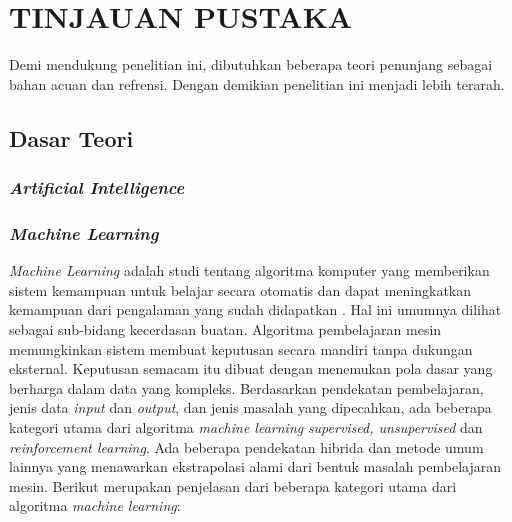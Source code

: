 \chapter{TINJAUAN PUSTAKA}
\label{chap:tinjauanpustaka}


Demi mendukung penelitian ini, dibutuhkan beberapa teori penunjang sebagai bahan acuan dan refrensi. Dengan demikian penelitian ini menjadi lebih terarah.

\section{Dasar Teori}
\label{sec:dasarteori}

\subsection{\textit{Artificial Intelligence}}
\label{artificialintelligence}

\subsection{\textit{Machine Learning}}
\label{machinelearning}

\textit{Machine Learning} adalah studi tentang algoritma komputer yang memberikan sistem kemampuan untuk belajar secara otomatis dan dapat meningkatkan kemampuan dari pengalaman yang sudah didapatkan \citep{machinelearning1}. Hal ini umumnya dilihat sebagai sub-bidang kecerdasan buatan. Algoritma pembelajaran mesin memungkinkan sistem membuat keputusan secara mandiri tanpa dukungan eksternal. Keputusan semacam itu dibuat dengan menemukan pola dasar yang berharga dalam data yang kompleks. Berdasarkan pendekatan pembelajaran, jenis data \textit{input} dan \textit{output}, dan jenis masalah yang dipecahkan, ada beberapa kategori utama dari algoritma \textit{machine learning} \textit{supervised, unsupervised} dan \textit{reinforcement learning}. Ada beberapa pendekatan hibrida dan metode umum lainnya yang menawarkan ekstrapolasi alami dari bentuk masalah pembelajaran mesin. Berikut merupakan penjelasan dari beberapa kategori utama dari algoritma \textit{machine learning}:

